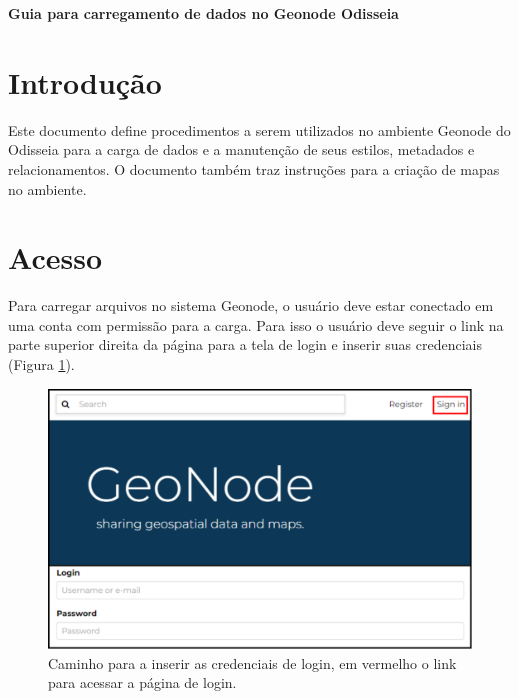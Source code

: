 \documentclass[12pt]{article}
\begin{document}
 


\begin{center}
  \vspace{12pt}
  \Large\textbf{Guia para carregamento de dados no Geonode Odisseia}
\end{center}

\section{Introdução}

Este documento define procedimentos a serem utilizados no ambiente Geonode do
Odisseia para a carga de dados e a manutenção de seus estilos, metadados e
relacionamentos. O documento também traz instruções para a criação de mapas no
ambiente.

\section{Acesso} \label{sec:firstpage}

Para carregar arquivos no sistema Geonode, o usuário deve estar conectado em
uma conta com permissão para a carga. Para isso o usuário deve seguir o link na
parte superior direita da página para a tela de login e inserir suas
credenciais (Figura \ref{fig:login}).

\begin{figure}[ht]
  \centering
  \includegraphics[width=\textwidth, keepaspectratio]{img/login.pdf}
  \caption{Caminho para a inserir as credenciais de login, em vermelho o link para acessar a página de login.}
  \label{fig:login}
\end{figure}
\end{document}
